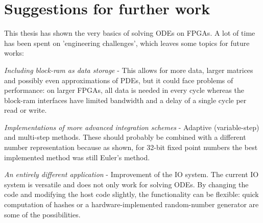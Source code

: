 \section{Suggestions for further work}
This thesis has shown the very basics of solving ODEs on FPGAs. A lot of time has been spent on 'engineering challenges', which leaves some topics for future works:
\begin{itemizens}
\item \emph{Including block-ram as data storage} - This allows for more data, larger matrices and possibly even approximations of PDEs, but it could face problems of performance: on larger FPGAs, all data is needed in every cycle whereas the block-ram interfaces have limited bandwidth and a delay of a single cycle per read or write.
\item \emph{Implementations of more advanced integration schemes} -  Adaptive (variable-step) and multi-step methods. These should probably be combined with a different number representation because as shown, for 32-bit fixed point numbers the best implemented method was still Euler's method.
\item \emph{An entirely different application} - Improvement of the IO system. The current IO system is versatile and does not only work for solving ODEs. By changing the \clash{} code and modifying the host code slightly, the functionality can be flexible: quick computation of hashes or a hardware-implemented random-number generator are some of the possibilities.
\end{itemizens}

